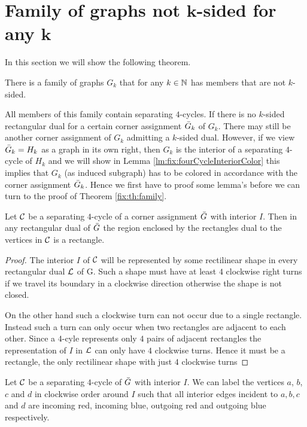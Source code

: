 
\section{Family of graphs not $\mathbf{k}$-sided for any $\mathbf{k}$}
\thispagestyle{plain}
  \label{s:fix}
  In this section we will show the following theorem.

  \begin{thrm}
    \label{fix:th:family}
      There is a family of graphs $G_k$ that for any $k \in \mathbb{N}$ has members that are not $k$-sided.
  \end{thrm}

  All members of this family contain separating $4$-cycles.
  If there is no $k$-sided rectangular dual for a certain corner assignment $\bar{G}_k$ of $G_k$. There may still be another corner assignment of $G_k$ admitting a $k$-sided dual.
  However, if we view $\bar{G}_k = H_k$ as a graph in its own right, then $G_k$ is the interior of a separating $4$-cycle of $H_k$ and we will show in Lemma \ref{lm:fix:fourCycleInteriorColor} this implies that $G_k$ (as induced subgraph) has to be colored in accordance with the corner assignment $\bar{G}_k$. Hence we first have to proof some lemma's before we can turn to the proof of Theorem \ref{fix:th:family}.

  \begin{lemma}
    \label{lm:interiorRectangle}
    Let $\mathcal{C}$ be a separating $4$-cycle of a corner assignment $\bar{G}$ with interior $I$. Then in any rectangular dual of $\bar{G}$ the region enclosed by the rectangles dual to the vertices in $\mathcal{C}$ is a rectangle.
  \end{lemma}
  \begin{proof}
    The interior $I$ of $\mathcal{C}$ will be represented by some rectilinear shape in every rectangular dual $\mathcal{L}$ of G. Such a shape must have at least $4$ clockwise right turns if we travel its boundary in a clockwise direction otherwise the shape is not closed.

    On the other hand such a clockwise turn can not occur due to a single rectangle. Instead such a turn can only occur when two rectangles are adjacent to each other. Since a $4$-cyle represents only $4$ pairs of adjacent rectangles the representation of $I$ in $\mathcal{L}$ can only have $4$ clockwise turns. Hence it must be a rectangle, the only rectilinear shape with just $4$ clockwise turns
  \end{proof}

  \begin{lemma}
  \label{lm:fix:fourCycleInteriorColor}
  Let $\mathcal{C}$ be a separating $4$-cycle of $\bar{G}$ with interior $I$. We can label the vertices $a$, $b$, $c$ and $d$ in clockwise order around $I$ such that all interior edges incident to $a, b, c$ and $d$ are incoming red, incoming blue, outgoing red and outgoing blue respectively.
  \end{lemma}

